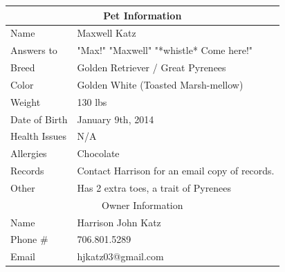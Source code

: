 \documentclass[pdftex,12pt]{article}
\begin{document}
\begin{table}[H]
    \begin{longtable}{@{}ll@{}}
        \toprule
        \multicolumn{2}{c}{Pet Information}                                                                                    \\ \midrule
        Name          & Maxwell Katz                                                                                           \\
        Answers to    & "Max!" "Maxwell" "*whistle* Come here!"                                                                \\
        Breed         & Golden Retriever / Great Pyrenees                                                                      \\
        Color         & Golden White (Toasted Marsh-mellow)                                                                    \\
        Weight        & 130 lbs                                                                                                \\
        Date of Birth & January 9th, 2014                                                                                      \\
        Health Issues & N/A                                                                                                    \\
        Allergies     & Chocolate                                                                                              \\
        Records       & Contact Harrison for an email copy of records.                                                         \\
        Other         & Has 2 extra toes, a trait of Pyrenees                                                                  \\ \midrule
        \multicolumn{2}{c}{Owner Information}                                                                                  \\ \midrule
        Name          & Harrison John Katz                                                                                     \\
        Phone \#      & 706.801.5289                                                                                           \\
        Email         & hjkatz03@gmail.com                                                                                     \\ \midrule

\end{longtable}
\end{table}
\end{document}
